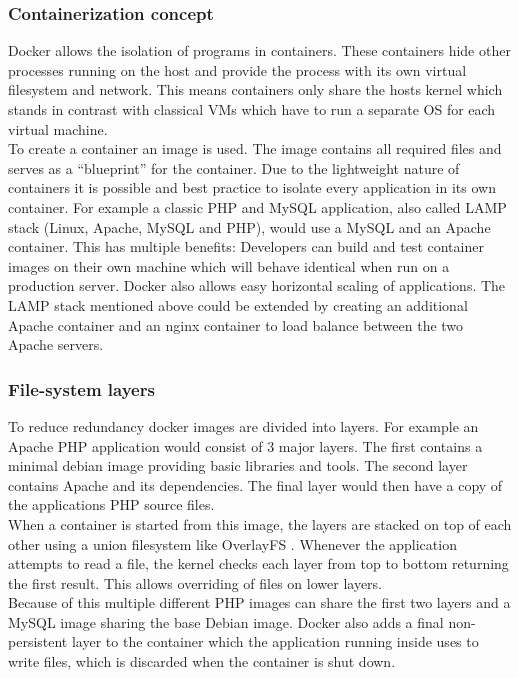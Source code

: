 \documentclass[conference,compsoc,final,a4paper]{IEEEtran}
\begin{document}
\subsubsection*{Containerization concept}
Docker allows the isolation of programs in containers. These containers hide other processes running on the host and provide the process with its own virtual filesystem
and network. This means containers only share the hosts kernel which stands in contrast with classical VMs which have to run a separate OS for
each virtual machine. \cite{bernstein2014containers}\\
To create a container an image is used. The image contains all required files and serves as a \enquote{blueprint} for the container. \cite{bernstein2014containers}
Due to the lightweight nature of containers it is possible and best practice to isolate every application in its own container. \cite{dockerBestPractices} For example a
classic PHP and MySQL application, also called LAMP stack (Linux, Apache, MySQL and PHP), would use a MySQL and an Apache container. This has multiple benefits:
Developers can build and test container images on their own machine which will behave identical when run on a production server. Docker also allows easy horizontal
scaling of applications. The LAMP stack mentioned above could be extended by creating an additional Apache container and an nginx container
to load balance between the two Apache servers.
\subsubsection*{File-system layers}
To reduce redundancy docker images are divided into layers. \cite{dockerBestPractices} For example an Apache PHP application would consist of 3
major layers. The first contains a minimal debian image providing basic libraries and tools. The second layer contains Apache and its dependencies. The final
layer would then have a copy of the applications PHP source files. \\
When a container is started from this image, the layers are stacked on top of each other
using a union filesystem like OverlayFS \cite{overlayfs}. Whenever the application attempts to read a file, the kernel checks each layer from top to bottom
returning the first result. This allows overriding of files on lower layers. \\
Because of this multiple different PHP images can share the first two layers and a MySQL image
sharing the base Debian image. Docker also adds a final non-persistent layer to the container which the application running inside uses to write files,
which is discarded when the container is shut down.
\end{document}
